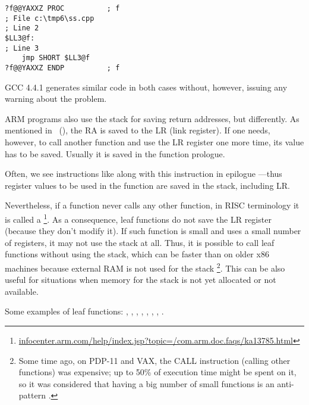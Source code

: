 \begin{lstlisting}[style=customasmx86]
?f@@YAXXZ PROC			; f
; File c:\tmp6\ss.cpp
; Line 2
$LL3@f:
; Line 3
	jmp	SHORT $LL3@f
?f@@YAXXZ ENDP			; f
\end{lstlisting}

GCC 4.4.1 generates similar code in both cases without, however,  issuing any warning about the problem.


ARM programs also use the stack for saving return addresses, but differently.
As mentioned in \q{\HelloWorldSectionName}~(),
the \ac{RA} is saved to the \ac{LR} (\gls{link register}).
If one needs, however, to call another function and use the \ac{LR} register
one more time, its value has to be saved.
Usually it is saved in the function prologue.

Often, we see instructions like  along with this instruction in epilogue
---thus register values to be used in the function are saved in the stack, including \ac{LR}.

Nevertheless, if a function never calls any other function, in \ac{RISC} terminology it is called a
\footnote{\href{http://go.yurichev.com/17064}{infocenter.arm.com/help/index.jsp?topic=/com.arm.doc.faqs/ka13785.html}}. 
As a consequence, leaf functions do not save the \ac{LR} register (because they don't modify it).
If such function is small and uses a small number of registers, it may not use the stack at all.
Thus, it is possible to call leaf functions without using the stack,
which can be faster than on older x86 machines because external RAM is not used for the stack
\footnote{Some time ago, on PDP-11 and VAX, the CALL instruction (calling other functions) was expensive; up to 50\%
of execution time might be spent on it, so it was considered that having a big number of small functions is an \gls{anti-pattern} .}.
This can be also useful for situations when memory for the stack is not yet allocated or not available.

Some examples of leaf functions:
, , 
, , ,
, , .

